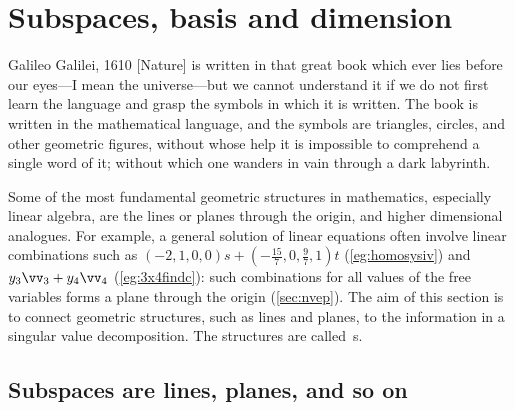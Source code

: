 
\section{Subspaces, basis and dimension}
\label{sec:sbd}
\secttoc

\begin{comment}
\pooliv{\S3.5, p191--206} \layiv{\S4.1--3} \holti{\S4.1--3}
\end{comment}


\begin{quoted}{Galileo Galilei, 1610}
[Nature] is written in that great book which ever lies before our eyes---I mean the universe---but we cannot understand it if we do not first learn the language and grasp the symbols in which it is written. 
The book is written in the mathematical language, and the symbols are triangles, circles, and other geometric figures, without whose help it is impossible to comprehend a single word of it; without which one wanders in vain through a dark labyrinth.
\end{quoted}


Some of the most fundamental geometric structures in mathematics, especially linear algebra, are the lines or planes through the origin, and higher dimensional analogues.
For example, a general solution of linear equations often involve linear combinations such as \((-2,1,0,0)s+(-\frac{15}7,0,\frac97,1)t\) (\autoref{eg:homosysiv}) and \(y_3\vv_3+y_4\vv_4\) (\autoref{eg:3x4findc}): such combinations for all values of the free variables forms a plane through the origin (\autoref{sec:nvep}).
The aim of this section is to connect geometric structures, such as lines and planes, to the information in a singular value decomposition.
The structures are called~s.


\subsection{Subspaces are lines, planes, and so on}

